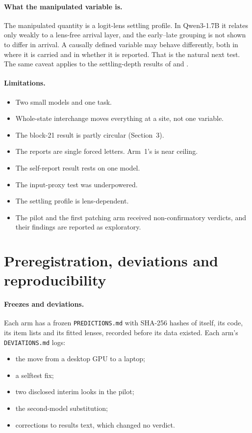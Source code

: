 \documentclass[11pt]{article}
\begin{document}
\paragraph{What the manipulated variable is.} The manipulated quantity is a logit-lens settling profile. In Qwen3-1.7B it relates only weakly to a lens-free arrival layer, and the early--late grouping is not shown to differ in arrival. A causally defined variable may behave differently, both in where it is carried and in whether it is reported. That is the natural next test. The same caveat applies to the settling-depth results of \citet{ramdan2026crv2} and \citet{ramdan2026battery}.

\paragraph{Limitations.}
\begin{itemize}
\item Two small models and one task.
\item Whole-state interchange moves everything at a site, not one variable.
\item The block-21 result is partly circular (Section~3).
\item The reports are single forced letters. Arm~1's is near ceiling.
\item The self-report result rests on one model.
\item The input-proxy test was underpowered.
\item The settling profile is lens-dependent.
\item The pilot and the first patching arm received non-confirmatory verdicts, and their findings are reported as exploratory.
\end{itemize}

\section{Preregistration, deviations and reproducibility}

\paragraph{Freezes and deviations.} Each arm has a frozen \texttt{PREDICTIONS.md} with SHA-256 hashes of itself, its code, its item lists and its fitted lenses, recorded before its data existed. Each arm's \texttt{DEVIATIONS.md} logs:
\begin{itemize}
\item the move from a desktop GPU to a laptop;
\item a selftest fix;
\item two disclosed interim looks in the pilot;
\item the second-model substitution;
\item corrections to results text, which changed no verdict.
\end{itemize}
\end{document}
